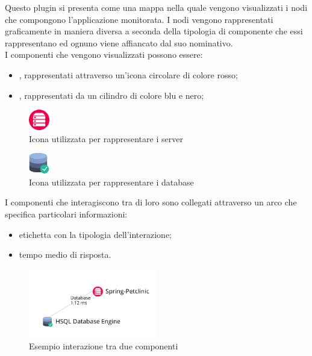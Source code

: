Questo plugin si presenta come una mappa nella quale vengono visualizzati i nodi  che compongono l'applicazione monitorata.
I nodi vengono rappresentati graficamente in maniera diversa a seconda della tipologia di componente che essi rappresentano ed ognuno viene affiancato dal suo nominativo.
\\ I componenti che vengono visualizzati possono essere:
\begin{itemize}
	\item \emph{}, rappresentati attraverso un'icona circolare di colore rosso;
	\item \emph{}, rappresentati da un cilindro di colore blu e nero;
\end{itemize}
\begin{figure}[H]
	\centering 
	\includegraphics[width=0.08\textwidth]{Images/server.png}
	\caption{Icona utilizzata per rappresentare i server}
	\label{server} 
\end{figure}
\begin{figure}[H]
	\centering 
	\includegraphics[width=0.08\textwidth]{Images/database.png}
	\caption{Icona utilizzata per rappresentare i database}
	\label{database} 
\end{figure}

I componenti che interagiscono tra di loro sono collegati attraverso un arco che specifica particolari informazioni:
\begin{itemize}
	\item etichetta con la tipologia dell'interazione;
	\item tempo medio di risposta.
\end{itemize}

\begin{figure}[H]
	\centering 
	\includegraphics[width=0.5\textwidth]{Images/componenti}
	\caption{Esempio interazione tra due componenti}
\end{figure}

